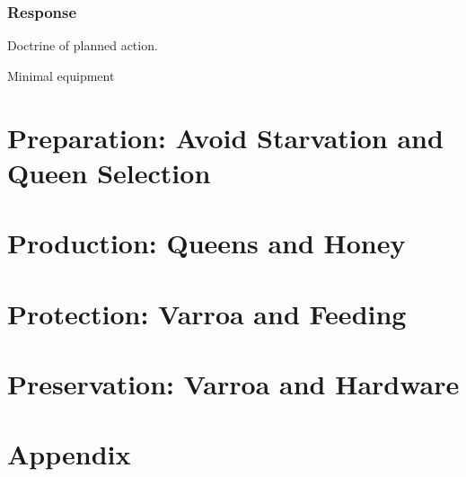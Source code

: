 \documentclass{./BeekeepingBook}
\begin{document}
\subsection*{Response}

Doctrine of planned action.

Minimal equipment

\chapter{Preparation: Avoid Starvation and Queen Selection}



\chapter{Production: Queens and Honey}



 
\chapter{Protection: Varroa and Feeding}




\chapter{Preservation: Varroa and Hardware}





\appendix
\chapter{Appendix}
\end{document}
